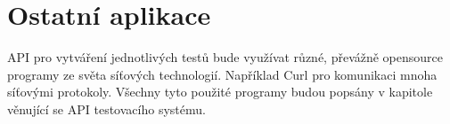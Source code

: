 \section{Ostatní aplikace}
API pro vytváření jednotlivých testů bude využívat různé, převážně opensource programy ze světa síťových technologií. Například Curl pro komunikaci mnoha síťovými protokoly. Všechny tyto použité programy budou popsány v kapitole věnující se API testovacího systému.

\endinput
